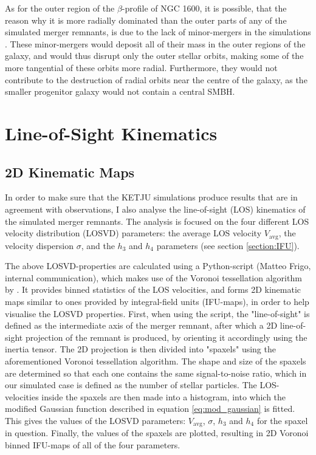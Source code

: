 \documentclass[english, twoside]{HYgradu}
\begin{document}
As for the outer region of the $\beta$-profile of NGC 1600, it is possible, that the reason why it is more radially dominated than the outer parts of any of the simulated merger remnants, is due to the lack of minor-mergers in the simulations \citep{Rantala2018}. These minor-mergers would deposit all of their mass in the outer regions of the galaxy, and would thus disrupt only the outer stellar orbits, making some of the more tangential of these orbits more radial. Furthermore, they would not contribute to the destruction of radial orbits near the centre of the galaxy, as the smaller progenitor galaxy would not contain a central SMBH.

\section{Line-of-Sight Kinematics}

\subsection{2D Kinematic Maps}

In order to make sure that the KETJU simulations produce results that are in agreement with observations, I also analyse the line-of-sight (LOS) kinematics of the simulated merger remnants. The analysis is focused on the four different LOS velocity distribution (LOSVD) parameters: the average LOS velocity $V_\mathrm{avg}$, the velocity dispersion $\sigma$, and the $h_3$ and $h_4$ parameters (see section \ref{section:IFU}). 

The above LOSVD-properties are calculated using a Python-script (Matteo Frigo, internal communication), which makes use of the Voronoi tessellation algorithm by \cite{Cappellari2003}. It provides binned statistics of the LOS velocities, and forms 2D kinematic maps similar to ones provided by integral-field units (IFU-maps), in order to help visualise the LOSVD properties. First, when using the script, the "line-of-sight" is defined as the intermediate axis of the merger remnant, after which a 2D line-of-sight projection of the remnant is produced, by orienting it accordingly using the inertia tensor. The 2D projection is then divided into "spaxels" using the aforementioned Voronoi tessellation algorithm. The shape and size of the spaxels are determined so that each one contains the same signal-to-noise ratio, which in our simulated case is defined as the number of stellar particles. The LOS-velocities inside the spaxels are then made into a histogram, into which the modified Gaussian function described in equation \ref{eq:mod_gaussian} is fitted. This gives the values of the LOSVD parameters: $V_\mathrm{avg}$, $\sigma$, $h_3$ and $h_4$ for the spaxel in question. Finally, the values of the spaxels are plotted, resulting in 2D Voronoi binned IFU-maps of all of the four parameters.
\end{document}
